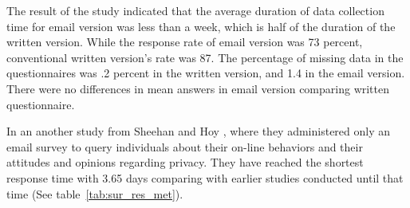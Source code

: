 The result of the study indicated that the average duration of data collection time for email version was less than a week, which is half of the duration of the written version. While the response rate of email version was 73 percent, conventional written version's rate was 87. The percentage of missing data in the questionnaires was .2 percent in the written version, and 1.4 in the email version. There were no differences in mean answers in email version comparing written questionnaire.
\vspace{1cm}

In an another study from Sheehan and Hoy \cite{Sheehan2006}, where they administered only an email survey to query individuals about their on-line behaviors and their attitudes and opinions regarding privacy. They have reached the shortest response time with 3.65 days comparing with earlier studies conducted until that time (See table~\ref{tab:sur_res_met}).

